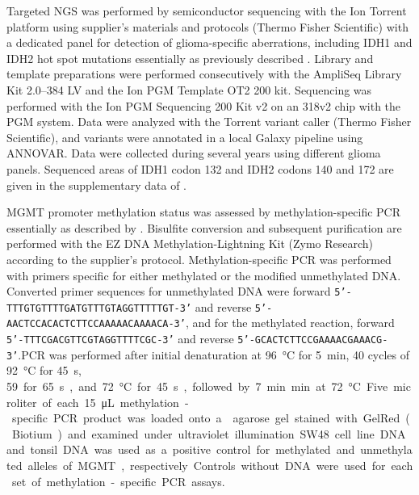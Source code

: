 Targeted \gls{NGS} was performed by semiconductor sequencing with the Ion Torrent platform using supplier's materials and protocols (Thermo Fisher Scientific) with a dedicated panel for detection of glioma-specific aberrations, including \gls{IDH}1 and \gls{IDH}2 hot spot mutations essentially as previously described \autocite{dubbink2015molecular}.
Library and template preparations were performed consecutively with the AmpliSeq Library Kit 2.0--384 LV and the Ion PGM Template OT2 200 kit.
Sequencing was performed with the Ion PGM Sequencing 200 Kit v2 on an 318v2 chip with the PGM system.
Data were analyzed with the Torrent variant caller (Thermo Fisher Scientific), and variants were annotated in a local Galaxy pipeline using ANNOVAR\@.
Data were collected during several years using different glioma panels.
Sequenced areas of \gls{IDH}1 codon 132 and \gls{IDH}2 codons 140 and 172 are given in the supplementary data of .

\gls{MGMT} promoter methylation status was assessed by methylation-specific PCR essentially as described by .
Bisulfite conversion and subsequent purification are performed with the EZ DNA Methylation-Lightning Kit (Zymo Research) according to the supplier's protocol.
Methylation-specific PCR was performed with primers specific for either methylated or the modified unmethylated DNA\@.
Converted primer sequences for unmethylated DNA were forward \linebreak[4]\texttt{5'-TTTGTGTTTTGATGTTTGTAGGTTTTTGT-3'} and reverse \linebreak[4]\texttt{5'-AACTCCACACTCTTCCAAAAACAAAACA-3'}, and for the methylated reaction, forward \linebreak[3]\texttt{5'-TTTCGACGTTCGTAGGTTTTCGC-3'} and reverse \linebreak[3]\texttt{5'-GCACTCTTCCGAAAACGAAACG-3'}\@.\linebreak[4]
PCR was performed after initial denaturation at \SI{96}{\celsius} for \SI{5}{\minute}, 40 cycles of \SI{92}{\celsius} for \SI{45}{\second}, \SI{59} for \SI{65}{\second}, and \SI{72}{\celsius} for \SI{45}{\second}, followed by \SI{7}{\minute} min at \SI{72}{\celsius}.
Five microliter of each \SI{15}{\micro\liter} methylation-specific PCR product was loaded onto a  agarose gel stained with GelRed (Biotium) and examined under ultraviolet illumination.
SW48 cell line DNA and tonsil DNA was used as a positive control for methylated and unmethylated alleles of \gls{MGMT}, respectively.
Controls without DNA were used for each set of methylation-specific PCR assays.

